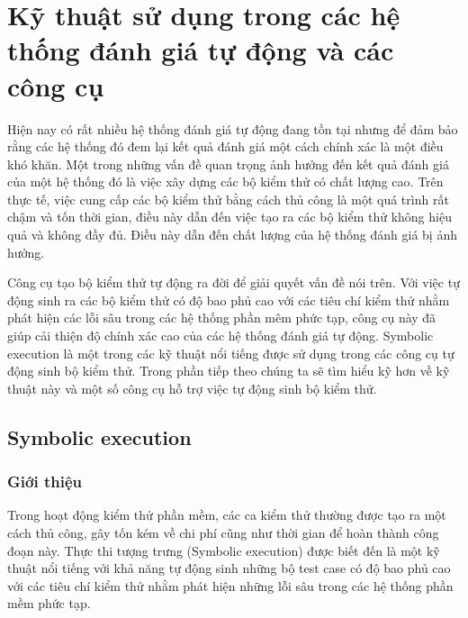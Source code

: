 \documentclass[12pt,a4paper]{article}
\begin{document}
\section{Kỹ thuật sử dụng trong các hệ thống đánh giá tự động và các công cụ}
Hiện nay có rất nhiều hệ thống đánh giá tự động đang tồn tại nhưng để đảm bảo rằng các hệ thống đó đem lại kết quả đánh giá một cách chính xác là một điều khó khăn. Một trong những vấn đề quan trọng ảnh hưởng đến kết quả đánh giá của một hệ thống đó là việc xây dựng các bộ kiểm thử có chất lượng cao. Trên thực tế, việc cung cấp các bộ kiểm thử bằng cách thủ công là một quá trình rất chậm và tốn thời gian, điều này dẫn đến việc tạo ra các bộ kiểm thử không hiệu quả và không đầy đủ. Điều này dẫn đến chất lượng của hệ thống đánh giá bị ảnh hưởng.

\indent Công cụ tạo bộ kiểm thử tự động ra đời để giải quyết vấn đề nói trên. Với việc tự động sinh ra các bộ kiểm thử có độ bao phủ cao với các tiêu chí kiểm thử nhằm phát hiện các lỗi sâu trong các hệ thống phần mêm phức tạp, công cụ này đã giúp cải thiện độ chính xác cao của các hệ thống đánh giá tự động. Symbolic execution là một trong các kỹ thuật nổi tiếng được sử dụng trong các công cụ tự động sinh bộ kiểm thử. Trong phần tiếp theo chúng ta sẽ tìm hiểu kỹ hơn về kỹ thuật này và một số công cụ hỗ trợ việc tự động sinh bộ kiểm thử.

\subsection{Symbolic execution}
\subsubsection{Giới thiệu}
Trong hoạt động kiểm thử phần mềm, các ca kiểm thử thường được tạo ra một cách thủ công, gây tốn kém về chi phí cũng như thời gian để hoàn thành công đoạn này. Thực thi tượng trưng (Symbolic execution) được biết đến là một kỹ thuật nổi tiếng với khả năng tự động sinh những bộ test case có độ bao phủ cao với các tiêu chí kiểm thử nhằm phát hiện những lỗi sâu trong các hệ thống phần mềm phức tạp.
\end{document}
